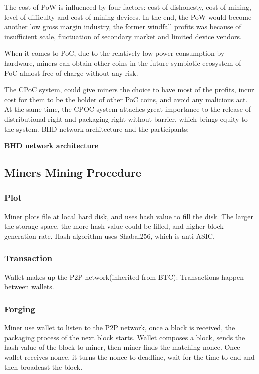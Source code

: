\begin{flushleft}
    The cost of PoW is influenced by four factors: cost of dishonesty, cost of mining, level of difficulty and cost of mining devices. In the end, the PoW would become another low gross margin industry, the former windfall profits was because of insufficient scale, fluctuation of secondary market and limited device vendors.
\end{flushleft}
\begin{flushleft}
    When it comes to PoC, due to the relatively low power consumption by hardware, miners can obtain other coins in the future symbiotic ecosystem of PoC almost free of charge without any risk.
\end{flushleft}
\begin{flushleft}
    The CPoC system, could give miners the choice to have most of the profits, incur cost for them to be the holder of other PoC coins, and avoid any malicious act. At the same time, the CPOC system attaches great importance to the release of distributional right and packaging right without barrier, which brings equity to the system. BHD network architecture and the participants:
\end{flushleft}
\begin{flushleft}
    \centering\textbf{BHD network architecture}
\end{flushleft}

\subsection{Miners Mining Procedure}
\subsubsection{Plot}
\begin{flushleft}
    Miner plots file at local hard disk, and uses hash value to fill the disk. The larger the storage space, the more hash value could be filled, and higher block generation rate. Hash algorithm uses Shabal256, which is anti-ASIC.
\end{flushleft}
\subsubsection{Transaction}
\begin{flushleft}
    Wallet makes up the P2P network(inherited from BTC): Transactions happen between wallets.
\end{flushleft}
\subsubsection{Forging}
\begin{flushleft}
    Miner use wallet to listen to the P2P network, once a block is received, the packaging process of the next block starts. Wallet composes a block, sends the hash value of the block to miner, then miner finds the matching nonce. Once wallet receives nonce, it turns the nonce to deadline, wait for the time to end and then broadcast the block.
\end{flushleft}
